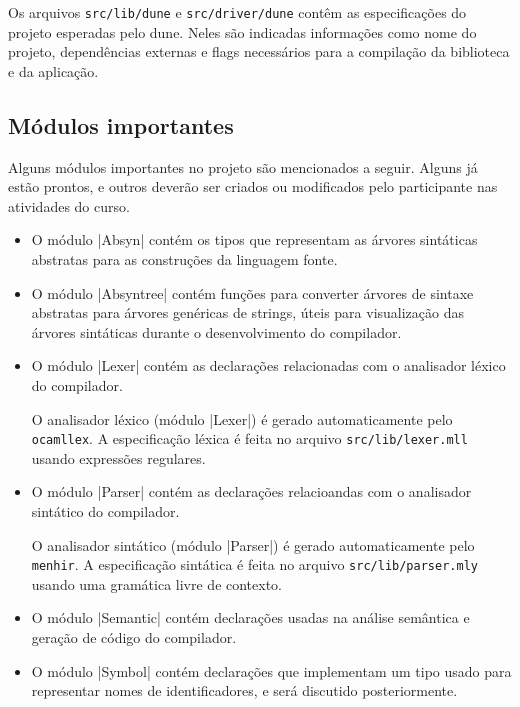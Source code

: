 \documentclass[a4paper,11pt,brazil]{article}
\begin{document}
Os arquivos \texttt{src/lib/dune} e \texttt{src/driver/dune} contêm as
especificações do projeto esperadas pelo dune. Neles são indicadas
informações como nome do projeto, dependências externas e flags
necessários para a compilação da biblioteca e da aplicação.

\subsection{Módulos importantes}

Alguns módulos importantes no projeto são mencionados a seguir. Alguns
já estão prontos, e outros deverão ser criados ou modificados pelo
participante nas atividades do curso.

\begin{itemize}
  \item O módulo \pyginline|Absyn| contém os tipos que representam as
  árvores sintáticas abstratas para as construções da linguagem fonte.

  \item O módulo \pyginline|Absyntree| contém funções para converter
  árvores de sintaxe abstratas para árvores genéricas de strings,
  úteis para visualização das árvores sintáticas durante o
  desenvolvimento do compilador.

  \item O módulo \pyginline|Lexer| contém as declarações relacionadas
  com o analisador léxico do compilador.

  O analisador léxico (módulo \pyginline|Lexer|) é gerado
  automaticamente pelo \texttt{ocamllex}. A especificação léxica é
  feita no arquivo \texttt{src/lib/lexer.mll} usando expressões
  regulares.

  \item O módulo \pyginline|Parser| contém as declarações relacioandas
  com o analisador sintático do compilador.

  O analisador sintático (módulo \pyginline|Parser|) é gerado
  automaticamente pelo \texttt{menhir}. A especificação sintática é
  feita no arquivo \texttt{src/lib/parser.mly} usando uma gramática
  livre de contexto.
  
  \item O módulo \pyginline|Semantic| contém declarações usadas na
  análise semântica e geração de código do compilador.

  \item O módulo \pyginline|Symbol| contém declarações que implementam
  um tipo usado para representar nomes de identificadores, e será
  discutido posteriormente.


\end{itemize}
\end{document}
